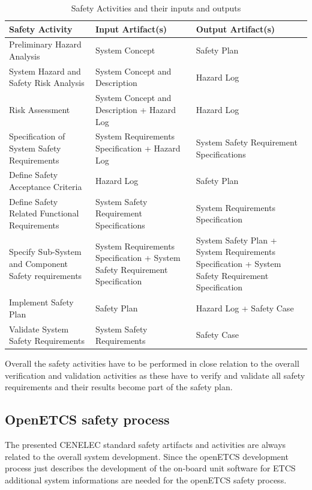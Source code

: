 \documentclass{template/openetcs_article}
\begin{document}
\begin{table}[h]
\centering
\caption{Safety Activities and their inputs and outputs}
\label{tab:SafetyAct}

\begin{tabular}{|p{5cm}|p{4cm}|p{4cm}|}
\hline \textbf{Safety Activity} & \textbf{Input Artifact(s)} & \textbf{Output Artifact(s)}  \\ 
\hline Preliminary Hazard Analysis & System Concept & Safety Plan \\ 
\hline System Hazard and Safety Risk Analysis & System Concept and Description & Hazard Log \\ 
\hline Risk Assessment & System Concept and Description + Hazard Log & Hazard Log \\ 
\hline Specification of System Safety Requirements & System Requirements Specification + Hazard Log  & System Safety Requirement Specifications \\ 
\hline Define Safety Acceptance Criteria & Hazard Log & Safety Plan  \\ 
\hline Define Safety Related Functional Requirements & System Safety Requirement Specifications & System Requirements Specification  \\ 
\hline Specify Sub-System and Component Safety requirements & System Requirements Specification + System Safety Requirement Specification & System Safety Plan + System Requirements Specification + System Safety Requirement Specification\\
\hline Implement Safety Plan & Safety Plan & Hazard Log + Safety Case \\
\hline Validate System Safety Requirements & System Safety Requirements & Safety Case \\
\hline 
\end{tabular}  
\end{table}

Overall the safety activities have to be performed in close relation to the overall verification and validation activities as these have to verify and validate all safety requirements and their results become part of the safety plan.


\subsection{OpenETCS safety process}

The presented CENELEC standard safety artifacts and activities are always related to the overall system development. Since the openETCS development process just describes the development of the on-board unit software for ETCS additional system informations are needed for the openETCS safety process. 
\end{document}
